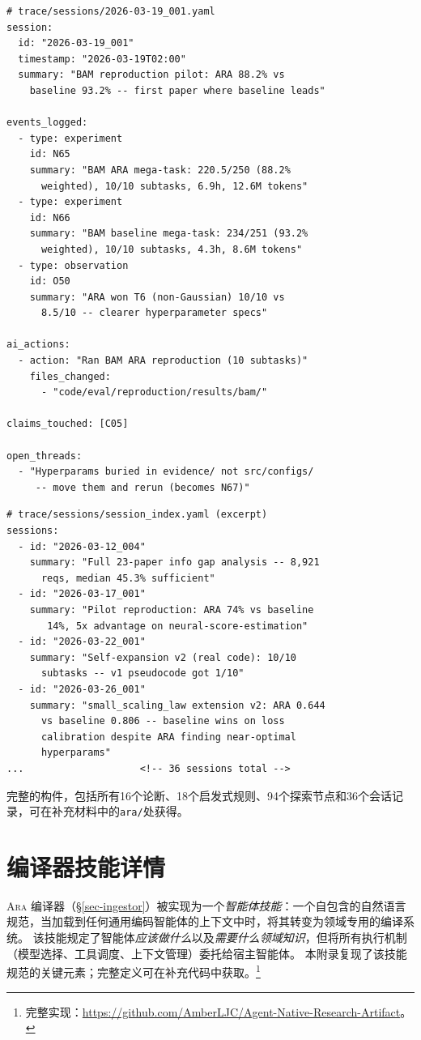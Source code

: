 \documentclass[
]{article}
\newcommand{\passthrough}[1]{#1}
\theoremstyle{definition}
\newcommand{\ara}{\textsc{Ara}}
\begin{document}
\begin{lstlisting}
# trace/sessions/2026-03-19_001.yaml
session:
  id: "2026-03-19_001"
  timestamp: "2026-03-19T02:00"
  summary: "BAM reproduction pilot: ARA 88.2% vs
    baseline 93.2% -- first paper where baseline leads"

events_logged:
  - type: experiment
    id: N65
    summary: "BAM ARA mega-task: 220.5/250 (88.2%
      weighted), 10/10 subtasks, 6.9h, 12.6M tokens"
  - type: experiment
    id: N66
    summary: "BAM baseline mega-task: 234/251 (93.2%
      weighted), 10/10 subtasks, 4.3h, 8.6M tokens"
  - type: observation
    id: O50
    summary: "ARA won T6 (non-Gaussian) 10/10 vs
      8.5/10 -- clearer hyperparameter specs"

ai_actions:
  - action: "Ran BAM ARA reproduction (10 subtasks)"
    files_changed:
      - "code/eval/reproduction/results/bam/"

claims_touched: [C05]

open_threads:
  - "Hyperparams buried in evidence/ not src/configs/
     -- move them and rerun (becomes N67)"
\end{lstlisting}

\begin{lstlisting}
# trace/sessions/session_index.yaml (excerpt)
sessions:
  - id: "2026-03-12_004"
    summary: "Full 23-paper info gap analysis -- 8,921
      reqs, median 45.3% sufficient"
  - id: "2026-03-17_001"
    summary: "Pilot reproduction: ARA 74% vs baseline
       14%, 5x advantage on neural-score-estimation"
  - id: "2026-03-22_001"
    summary: "Self-expansion v2 (real code): 10/10
      subtasks -- v1 pseudocode got 1/10"
  - id: "2026-03-26_001"
    summary: "small_scaling_law extension v2: ARA 0.644
      vs baseline 0.806 -- baseline wins on loss
      calibration despite ARA finding near-optimal
      hyperparams"
...                    <!-- 36 sessions total -->
\end{lstlisting}

完整的构件，包括所有16个论断、18个启发式规则、94个探索节点和36个会话记录，可在补充材料中的\passthrough{\lstinline!ara/!}处获得。

\section{编译器技能详情}\label{sec-app-system-details}

\ara{}
编译器（\S\ref{sec-ingestor}）被实现为一个\emph{智能体技能}：一个自包含的自然语言规范，当加载到任何通用编码智能体的上下文中时，将其转变为领域专用的编译系统。
该技能规定了智能体\emph{应该做什么}以及\emph{需要什么领域知识}，但将所有执行机制（模型选择、工具调度、上下文管理）委托给宿主智能体。
本附录复现了该技能规范的关键元素；完整定义可在补充代码中获取。\footnote{完整实现：\url{https://github.com/AmberLJC/Agent-Native-Research-Artifact}。}
\end{document}
